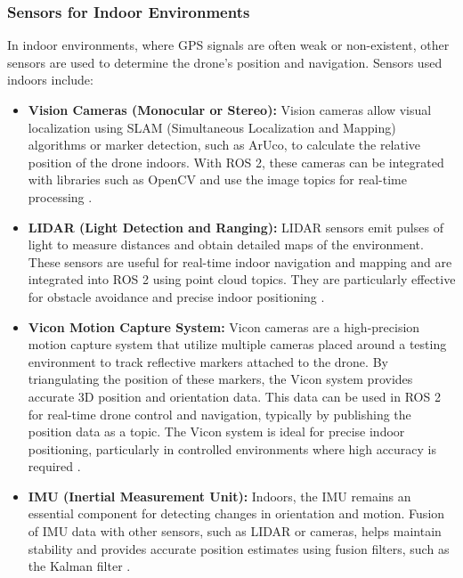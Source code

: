     \subsubsection{Sensors for Indoor Environments}
    In indoor environments, where GPS signals are often weak or non-existent, other sensors are used to determine the drone's position and navigation. Sensors used indoors include:
    \begin{itemize}
        \item \textbf{Vision Cameras (Monocular or Stereo):} Vision cameras allow visual localization using SLAM (Simultaneous Localization and Mapping) algorithms or marker detection, such as ArUco, to calculate the relative position of the drone indoors. With ROS 2, these cameras can be integrated with libraries such as OpenCV and use the image topics for real-time processing \cite{non_gps_navigation}.
    
        \item \textbf{LIDAR (Light Detection and Ranging):} LIDAR sensors emit pulses of light to measure distances and obtain detailed maps of the environment. These sensors are useful for real-time indoor navigation and mapping and are integrated into ROS 2 using point cloud topics. They are particularly effective for obstacle avoidance and precise indoor positioning \cite{non_gps_navigation}.
        
        \item \textbf{Vicon Motion Capture System:} Vicon cameras are a high-precision motion capture system that utilize multiple cameras placed around a testing environment to track reflective markers attached to the drone. By triangulating the position of these markers, the Vicon system provides accurate 3D position and orientation data. This data can be used in ROS 2 for real-time drone control and navigation, typically by publishing the position data as a topic. The Vicon system is ideal for precise indoor positioning, particularly in controlled environments where high accuracy is required \cite{non_gps_navigation}.

        \item \textbf{IMU (Inertial Measurement Unit):} Indoors, the IMU remains an essential component for detecting changes in orientation and motion. Fusion of IMU data with other sensors, such as LIDAR or cameras, helps maintain stability and provides accurate position estimates using fusion filters, such as the Kalman filter \cite{non_gps_navigation}.
        
    \end{itemize}
    
    

